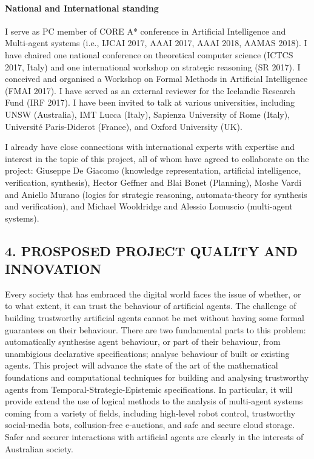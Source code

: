 \documentclass[a4paper,12pt]{scrartcl}
\def\TSE{Temporal-Strategic-Epistemic\xspace}
\begin{document}
\paragraph{National and International standing}



I serve as PC member of CORE A* conference in Artificial Intelligence and Multi-agent systems (i.e., IJCAI 2017, AAAI 2017, AAAI 2018, AAMAS 2018). I have chaired one national conference on theoretical computer science (ICTCS 2017, Italy) and one international workshop on strategic reasoning (SR 2017). I conceived and organised a Workshop on Formal Methods in Artificial Intelligence (FMAI 2017). 
I have served as an external reviewer for the Icelandic Research Fund (IRF 2017). I have been invited to talk at various universities, including UNSW (Australia), IMT Lucca (Italy), Sapienza University of Rome (Italy), Universit\'e Paris-Diderot (France), and Oxford University (UK).

I already have close connections with international experts with expertise and interest in the topic of this project, all of whom have agreed to collaborate on the project: Giuseppe De Giacomo (knowledge representation, artificial intelligence, verification, synthesis), Hector Geffner and Blai Bonet (Planning), Moshe Vardi and Aniello Murano (logics for strategic reasoning, automata-theory for synthesis and verification), and Michael Wooldridge and Alessio Lomuscio (multi-agent systems).



\subsection*{4. PROSPOSED PROJECT QUALITY AND INNOVATION}

Every society that has embraced the digital world faces the issue of whether, or to what extent, it can trust the behaviour 
of artificial agents. The challenge of building trustworthy artificial agents cannot be met without having some formal guarantees on their 
behaviour. There are two fundamental parts to this problem: automatically synthesise agent behaviour, or part of their behaviour, from unambigious declarative 
specifications; analyse behaviour of built or existing agents. This project will advance the state of the art of the mathematical foundations and computational techniques 
for building and analysing trustworthy agents from \TSE specifications. In particular, it will provide extend the use of logical methods to the analysis of multi-agent systems coming 
from a variety of fields, including high-level robot control, trustworthy social-media bots, collusion-free e-auctions, and safe and secure cloud storage. 
Safer and securer interactions with artificial agents are clearly in the interests of Australian society. 
\end{document}
